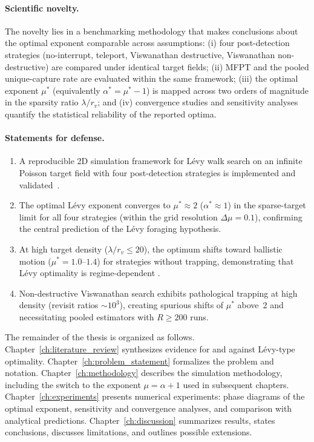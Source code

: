 \paragraph{Scientific novelty.}
The novelty lies in a benchmarking methodology that makes conclusions about the optimal exponent comparable across assumptions: (i) four post-detection strategies (no-interrupt, teleport, Viswanathan destructive, Viswanathan non-destructive) are compared under identical target fields; (ii) MFPT and the pooled unique-capture rate are evaluated within the same framework; (iii) the optimal exponent $\mu^*$ (equivalently $\alpha^* = \mu^* - 1$) is mapped across two orders of magnitude in the sparsity ratio $\lambda/r_v$; and (iv) convergence studies and sensitivity analyses quantify the statistical reliability of the reported optima.

\paragraph{Statements for defense.}
\begin{enumerate}
    \item A reproducible 2D simulation framework for L\'evy walk search on an infinite Poisson target field with four post-detection strategies is implemented and validated~\cite{viswanathan1999optimizing}.
    \item The optimal L\'evy exponent converges to $\mu^* \approx 2$ ($\alpha^* \approx 1$) in the sparse-target limit for all four strategies (within the grid resolution $\Delta\mu = 0.1$), confirming the central prediction of the L\'evy foraging hypothesis.
    \item At high target density ($\lambda/r_v \leq 20$), the optimum shifts toward ballistic motion ($\mu^* = 1.0$--$1.4$) for strategies without trapping, demonstrating that L\'evy optimality is regime-dependent \cite{levernier2020inverse, bartumeus2005animal}.
    \item Non-destructive Viswanathan search exhibits pathological trapping at high density (revisit ratios $\sim 10^3$), creating spurious shifts of $\mu^*$ above~2 and necessitating pooled estimators with $R \geq 200$ runs.
\end{enumerate}

The remainder of the thesis is organized as follows.
Chapter~\ref{ch:literature_review} synthesizes evidence for and
against L\'evy-type optimality.
Chapter~\ref{ch:problem_statement} formalizes the problem and
notation.
Chapter~\ref{ch:methodology} describes the simulation methodology,
including the switch to the exponent $\mu = \alpha + 1$ used in
subsequent chapters.
Chapter~\ref{ch:experiments} presents numerical experiments:
phase diagrams of the optimal exponent, sensitivity and convergence
analyses, and comparison with analytical predictions.
Chapter~\ref{ch:discussion} summarizes results, states
conclusions, discusses limitations, and outlines possible
extensions.
